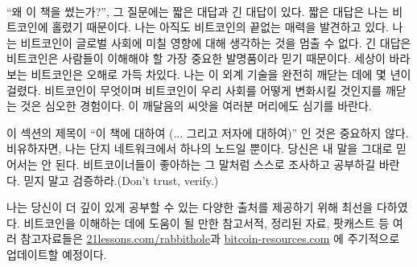 \paragraph{}
\enquote{왜 이 책을 썼는가?},
그 질문에는 짧은 대답과 긴 대답이 있다. 
짧은 대답은 나는 비트코인에 홀렸기 때문이다.
나는 아직도 비트코인의 끝없는 매력을 발견하고 있다. 
나는 비트코인이 글로벌 사회에 미칠 영향에 대해 생각하는 것을 멈출 수 없다.
긴 대답은 비트코인은 사람들이 이해해야 할 가장 중요한 발명품이라 믿기 때문이다. 
세상이 바라보는 비트코인은 오해로 가득 차있다.
나는 이 외계 기술을 완전히 깨닫는 데에 몇 년이 걸렸다. 
비트코인이 무엇이며 비트코인이 우리 사회를 어떻게 변화시킬 것인지를 깨닫는 것은 심오한 경험이다.
이 깨달음의 씨앗을 여러분 머리에도 심기를 바란다.

이 섹션의 제목이 \enquote{이 책에 대하여 (... 그리고 저자에 대하여)} 인 것은 중요하지 않다. 
비유하자면, 나는 단지 네트워크에서 하나의 노드일 뿐이다. 
당신은 내 말을 그대로 믿어서는 안 된다. 
비트코이너들이 좋아하는 그 말처럼 스스로 조사하고 공부하길 바란다. 
믿지 말고 검증하라.(Don't trust, verify.)



나는 당신이 더 깊이 있게 공부할 수 있는 다양한 출처를 제공하기 위해 최선을 다하였다. 
비트코인을 이해하는 데에 도움이 될 만한  참고서적, 정리된 자료, 팟캐스트 등 여러 
참고자료들은 \href{https://21lessons.com/rabbithole}{21lessons.com/rabbithole}과 \href{https://bitcoin-resources.com}{bitcoin-resources.com}
에 주기적으로 업데이트할 예정이다. 


